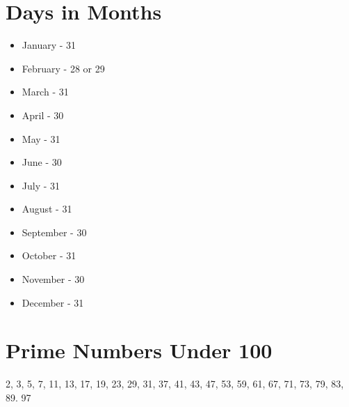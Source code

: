 \documentclass[../uilmath.tex]{subfiles}
\begin{document}
\section*{Days in Months}
\begin{itemize}
    \item January - 31 
    \item February - 28 or 29 
    \item March - 31 
    \item April - 30 
    \item May - 31 
    \item June - 30
    \item July - 31 
    \item August - 31
    \item September - 30
    \item October - 31
    \item November - 30
    \item December - 31
\end{itemize}

\section*{Prime Numbers Under 100}
2, 3, 5, 7, 11, 13, 17, 19, 23, 29, 31, 37, 41, 43, 47, 53, 59, 61, 67, 71, 73, 79, 83, 89. 97
\end{document}
